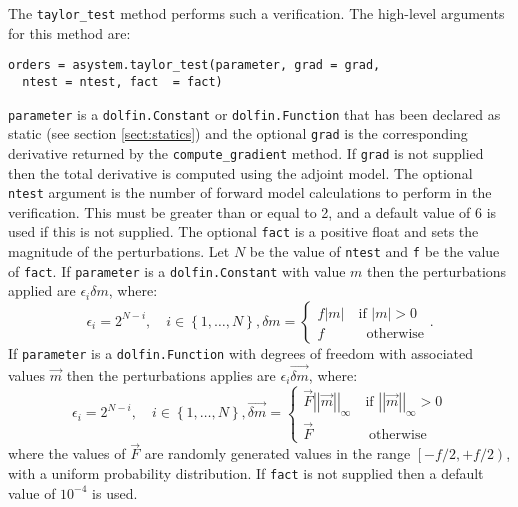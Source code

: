 \documentclass[a4paper]{book}
\begin{document}
The \verb+taylor_test+ method performs such a verification. The high-level
arguments for this method are:
\begin{lstlisting}
orders = asystem.taylor_test(parameter, grad = grad,
  ntest = ntest, fact  = fact)
\end{lstlisting}
\verb+parameter+ is a \verb+dolfin.Constant+ or \verb+dolfin.Function+ that has
been declared as static (see section \ref{sect:statics}) and the optional
\verb+grad+ is the corresponding derivative returned by the
\verb+compute_gradient+ method. If \verb+grad+ is not supplied then the
total derivative is computed using the adjoint model. The optional \verb+ntest+
argument is the number of forward model calculations to perform in the
verification. This must be greater than or equal to 2, and a default value of 6
is used if this is not supplied. The optional \verb+fact+ is a positive float
and sets the magnitude of the perturbations. Let $N$ be the value of
\verb+ntest+ and \verb+f+ be the value of \verb+fact+. If \verb+parameter+ is a
\verb+dolfin.Constant+ with value $m$ then the perturbations applied are
$\epsilon_i \delta m$, where:
\begin{subequations}
  \begin{equation}
    \epsilon_i = 2^{N - i}, \quad i \in \left\{1, \ldots, N \right\},
  \end{equation}
  \begin{equation}
    \delta m = \left\{ \begin{array}{l} f \left| m \right| \quad \textrm{if } \left| m \right| > 0 \\ f \qquad \quad \textrm{otherwise} \end{array} \right. .
  \end{equation}
\end{subequations}
If \verb+parameter+ is a \verb+dolfin.Function+ with degrees of freedom
with associated values $\vec{m}$ then the perturbations applies are
$\epsilon_i \vec{\delta m}$, where:
\begin{subequations}
  \begin{equation}
    \epsilon_i = 2^{N - i}, \quad i \in \left\{1, \ldots, N \right\},
  \end{equation}
  \begin{equation}
    \vec{\delta m} = \left\{ \begin{array}{l} \vec{F} \left|\left| \vec{m} \right|\right|_\infty \quad \textrm{if } \left|\left| \vec{m} \right|\right|_\infty > 0 \\ \vec{F} \qquad \qquad \textrm{otherwise} \end{array} \right.
  \end{equation}
\end{subequations}
where the values of $\vec{F}$ are randomly generated values in the range
$\left[ -f/2, +f/2 \right)$, with a uniform probability distribution. If
\verb+fact+ is not supplied then a default value of $10^{-4}$ is used.
\end{document}
